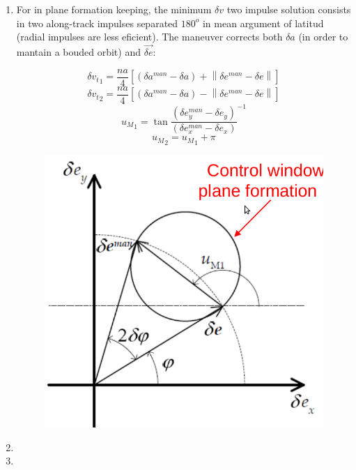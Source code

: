 \documentclass[a4paper]{article}
\newcommand\norm[1]{\left\lVert#1\right\rVert}
\begin{document}
\begin{enumerate}[label=\emph{\alph*)}]
  \item %
    For in plane formation keeping, the minimum $\delta v$ two impulse solution consists in two along-track impulses separated $180^o$ in mean argument of latitud (radial impulses are less eficient). The maneuver corrects both $\delta a$ (in order to mantain a bouded orbit) and $\vec{\delta e}$:\\
    \begin{figure}[h]
    \begin{minipage}{0.5\textwidth}
      \[\delta {v_t}_1 = \frac{n a}{4} \left[ (\delta a^{man} - \delta a) + \norm{\delta e^{man} - \delta e} \right] \]
      \[\delta {v_t}_2 = \frac{n a}{4} [(\delta a^{man} - \delta a) - \norm{\delta e^{man} - \delta e}] \]
      \[{u_M}_1 = \tan{\frac{(\delta e_y^{man}-\delta e_y)}{(\delta e_x^{man} - \delta e_x)}}^{-1} \]
      \[{u_M}_2 = {u_M}_1 + \pi \]
    \end{minipage}
    \begin{minipage}{0.5\textwidth}
	\centering
	\includegraphics[width=\textwidth]{In-plane_maneuvre}
    \end{minipage}
  \end{figure}

  \item %

  \item %

\end{enumerate}
\end{document}
